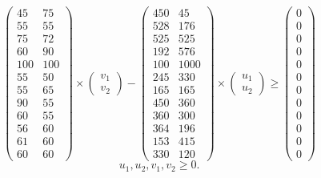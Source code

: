 \documentclass{article}
\begin{document}
$$ \begin{pmatrix}
45 & 75 \\
55 & 55 \\
75 & 72 \\
60 & 90 \\
100 & 100 \\
55 & 50 \\
55 & 65 \\
90 & 55 \\
60 & 55 \\
56 & 60 \\
61 & 60 \\
60 & 60
\end{pmatrix}
\times
\begin{pmatrix}
v_1 \\
v_2
\end{pmatrix}
-
\begin{pmatrix}
450 & 45 \\
528 & 176 \\
525 & 525 \\
192 & 576 \\
100 & 1000 \\
245 & 330 \\
165 & 165\\
450 & 360 \\
360 & 300 \\
364 & 196 \\
153 & 415 \\
330 & 120
\end{pmatrix}
\times
\begin{pmatrix}
u_1 \\
u_2
\end{pmatrix}
\geq
\begin{pmatrix}
0 \\
0 \\
0 \\
0 \\
0 \\
0 \\
0 \\
0 \\
0 \\
0 \\
0 \\
0 
\end{pmatrix} $$
$$ u_1, u_2, v_1, v_2 \geq 0. $$
\end{document}
